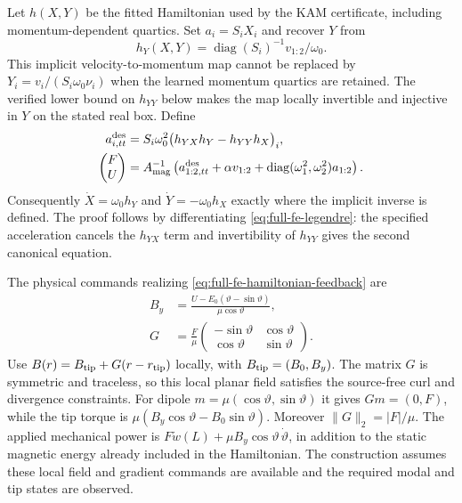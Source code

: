 Let $h(X,Y)$ be the fitted Hamiltonian used by the KAM
certificate, including momentum-dependent quartics. Set
$a_i=S_iX_i$ and recover $Y$ from
\begin{equation}
 h_Y(X,Y)=\operatorname{diag}(S_i)^{-1}v_{1:2}/\omega_0.
 \label{eq:full-fe-legendre}
\end{equation}
This implicit velocity-to-momentum map cannot be replaced by $Y_i=v_i/(S_i
\omega_0\nu_i)$ when the learned momentum quartics are retained. The
verified lower bound on $h_{YY}$ below makes the map locally invertible and
injective in $Y$ on the stated real box. Define
\begin{align}
 a^{\rm des}_{i,tt}
 &=S_i\omega_0^2\bigl(h_{YX}h_Y-h_{YY}h_X\bigr)_i,\\
 \begin{pmatrix}F\\U\end{pmatrix}
 &=A_{\rm mag}^{-1}
   \left(a^{\rm des}_{1:2,tt}+\alpha v_{1:2}
          +\operatorname{diag}(\omega_1^2,\omega_2^2)a_{1:2}\right).
 \label{eq:full-fe-hamiltonian-feedback}
\end{align}
Consequently $\dot X=\omega_0h_Y$ and $\dot Y=-\omega_0h_X$ exactly
where the implicit inverse is defined. The proof follows by differentiating
\eqref{eq:full-fe-legendre}: the specified acceleration cancels the $h_{YX}$
term and invertibility of $h_{YY}$ gives the second canonical equation.

The physical commands realizing \eqref{eq:full-fe-hamiltonian-feedback} are
\begin{equation}
 \begin{aligned}
 B_y&=\frac{U-E_0(\vartheta-\sin\vartheta)}{\mu\cos\vartheta},\\
 G&=\frac{F}{\mu}
 \begin{pmatrix}-\sin\vartheta&\cos\vartheta\\
                 \cos\vartheta&\sin\vartheta\end{pmatrix}.
 \end{aligned}
 \label{eq:physical-gradient-command}
\end{equation}
Use $B(r)=B_{\rm tip}+G(r-r_{\rm tip})$ locally, with
$B_{\rm tip}=(B_0,B_y)$. The matrix $G$ is symmetric and traceless,
so this local planar field satisfies the source-free curl and divergence
constraints. For dipole $m=\mu(\cos\vartheta,\sin\vartheta)$ it gives
$Gm=(0,F)$, while the tip torque is
$\mu(B_y\cos\vartheta-B_0\sin\vartheta)$.
Moreover $\|G\|_2=|F|/\mu$. The applied mechanical power is
$F\dot w(L)+\mu B_y\cos\vartheta\,\dot\vartheta$, in addition to
the static magnetic energy already included in the Hamiltonian.
The construction assumes these local field and gradient commands are
available and the required modal and tip states are observed.

